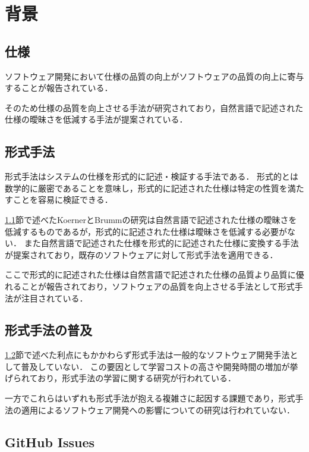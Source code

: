 \documentclass[main]{subfiles}
\begin{document}
\chapter{背景}

\section{仕様}
\label{sec:specification}

ソフトウェア開発において仕様の品質の向上がソフトウェアの品質の向上に寄与することが報告されている\cite{knauss:2009}．

そのため仕様の品質を向上させる手法が研究されており，自然言語で記述された仕様の曖昧さを低減する手法が提案されている\cite{koerner:2011}．

\section{形式手法}
\label{sec:formal-method}

形式手法はシステムの仕様を形式的に記述・検証する手法である．
形式的とは数学的に厳密であることを意味し，形式的に記述された仕様は特定の性質を満たすことを容易に検証できる．

\ref{sec:specification}節で述べたKoernerとBrummの研究は自然言語で記述された仕様の曖昧さを低減するものであるが，形式的に記述された仕様は曖昧さを低減する必要がない．
また自然言語で記述された仕様を形式的に記述された仕様に変換する手法が提案されており\cite{ilieva:2005}，既存のソフトウェアに対して形式手法を適用できる．

ここで形式的に記述された仕様は自然言語で記述された仕様の品質より品質に優れることが報告されており\cite{fabbrini:2001}，ソフトウェアの品質を向上させる手法として形式手法が注目されている．%

\section{形式手法の普及}

\ref{sec:formal-method}節で述べた利点にもかかわらず形式手法は一般的なソフトウェア開発手法として普及していない．
この要因として学習コストの高さ\cite{kurita:2011}や開発時間の増加\cite{kitamura:2021}が挙げられており，形式手法の学習に関する研究が行われている\cite{ohnishi:2020,araki:2010,araki:2011}．

一方でこれらはいずれも形式手法が抱える複雑さに起因する課題であり，形式手法の適用によるソフトウェア開発への影響についての研究は行われていない．

\section{GitHub Issues}
\end{document}
